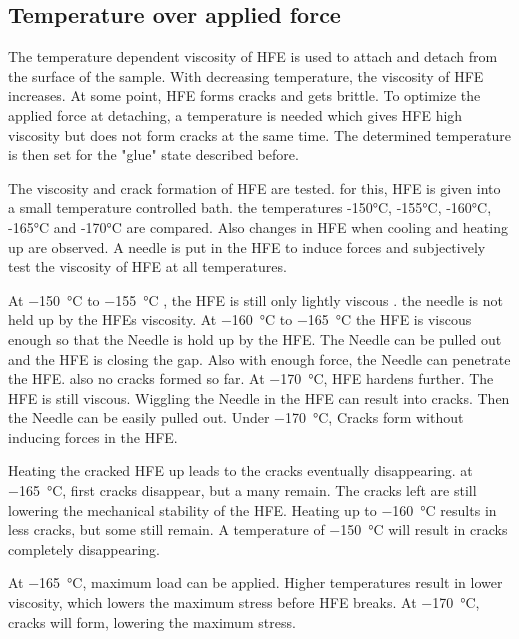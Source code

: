 \subsection{Temperature over applied force}

The temperature dependent viscosity of HFE is used to attach and detach from the surface of the sample. With decreasing temperature, the viscosity of HFE increases. At some point, HFE forms cracks and gets brittle. To optimize the applied force at detaching, a temperature is needed which gives HFE high viscosity but does not form cracks at the same time. The determined temperature is then set for the "glue" state described before.

The viscosity and crack formation of HFE are tested. for this, HFE is given into a small temperature controlled bath. the temperatures -150°C, -155°C, -160°C, -165°C and -170°C are compared. Also changes in HFE when cooling and heating up are observed. A needle is put in the HFE to induce forces and subjectively test the viscosity of HFE at all temperatures.

At \SI{-150}{\degreeCelsius} to  \SI{-155}{\degreeCelsius} , the HFE is still only lightly viscous . the needle is not held up by the HFEs viscosity. At \SI{-160}{\degreeCelsius} to  \SI{-165}{\degreeCelsius} the HFE is viscous enough so that the Needle is hold up by the HFE. The Needle can be pulled out and the HFE is closing the gap. Also with enough force, the Needle can penetrate the HFE. also no cracks formed so far. At \SI{-170}{\degreeCelsius}, HFE hardens further. The HFE is still viscous. Wiggling the Needle in the HFE can result into cracks. Then the Needle can be easily pulled out. Under \SI{-170}{\degreeCelsius}, Cracks form without inducing forces in the HFE.

Heating the cracked HFE up leads to the cracks eventually disappearing. at \SI{-165}{\degreeCelsius}, first cracks disappear, but a many remain. The cracks left are still lowering the mechanical stability of the HFE. Heating up to \SI{-160}{\degreeCelsius} results in less cracks, but some still remain. A temperature of \SI{-150}{\degreeCelsius} will result in cracks completely disappearing.

At \SI{-165}{\degreeCelsius}, maximum load can be applied. Higher temperatures result in lower viscosity, which lowers the maximum stress before HFE breaks. At \SI{-170}{\degreeCelsius}, cracks will form, lowering the maximum stress.


